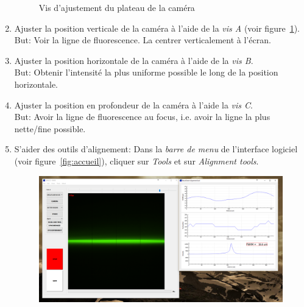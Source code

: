 \begin{enumerate}
\begin{figure}[H]
        \caption{Vis d'ajustement du plateau de la caméra}
            \begin{footnotesize}  \end{footnotesize}
        \label{fig:vis}
        \end{figure}
    \item Ajuster la position verticale de la caméra à l'aide de la \textit{vis A} (voir figure~\ref{fig:vis}).
    \\ But: Voir la ligne de fluorescence. La centrer verticalement à l'écran.
    \item Ajuster la position horizontale de la caméra à l'aide de la \textit{vis B}.
    \\ But: Obtenir l'intensité la plus uniforme possible le long de la position horizontale.
    \item Ajuster la position en profondeur de la caméra à l'aide la \textit{vis C}.
    \\ But: Avoir la ligne de fluorescence au focus, i.e. avoir la ligne la plus nette/fine possible.
    \item S'aider des outils d'alignement: Dans la \textit{barre de menu} de l'interface logiciel (voir figure~\ref{fig:accueil}), cliquer sur \textit{Tools} et sur \textit{Alignment tools}.
        \begin{figure}[H]
        \centering
        \includegraphics[width=\linewidth]{alignement.PNG}

\end{figure}
\end{enumerate}
